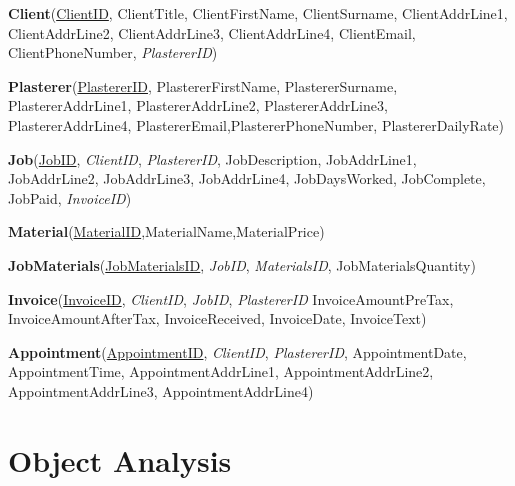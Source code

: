\begin{flushleft}
	\textbf{Client}(\underline{ClientID}, ClientTitle, ClientFirstName, ClientSurname, ClientAddrLine1, ClientAddrLine2, ClientAddrLine3, ClientAddrLine4, ClientEmail, ClientPhoneNumber, \emph{PlastererID})
\end{flushleft}



\begin{flushleft}
	\textbf{Plasterer}(\underline{PlastererID}, PlastererFirstName, PlastererSurname, PlastererAddrLine1, PlastererAddrLine2, PlastererAddrLine3, PlastererAddrLine4, PlastererEmail,PlastererPhoneNumber, PlastererDailyRate)
\end{flushleft}



\begin{flushleft}
\textbf{Job}(\underline{JobID}, \emph{ClientID}, \emph{PlastererID}, JobDescription, JobAddrLine1, JobAddrLine2, JobAddrLine3, JobAddrLine4, JobDaysWorked,  JobComplete, JobPaid, \emph{InvoiceID})
\end{flushleft}


\begin{flushleft}
\textbf{Material}(\underline{MaterialID},MaterialName,MaterialPrice)
\end{flushleft}


\begin{flushleft}
\textbf{JobMaterials}(\underline{JobMaterialsID}, \emph{JobID}, \emph{MaterialsID}, JobMaterialsQuantity)
\end{flushleft}


\begin{flushleft}
\textbf{Invoice}(\underline{InvoiceID}, \emph{ClientID}, \emph{JobID}, \emph{PlastererID} InvoiceAmountPreTax, InvoiceAmountAfterTax, InvoiceReceived, InvoiceDate, InvoiceText)
\end{flushleft}



\begin{flushleft}
\textbf{Appointment}(\underline{AppointmentID}, \emph{ClientID}, \emph{PlastererID}, AppointmentDate, AppointmentTime, AppointmentAddrLine1, AppointmentAddrLine2, AppointmentAddrLine3, AppointmentAddrLine4)
\end{flushleft}


\pagebreak
\section{Object Analysis}

